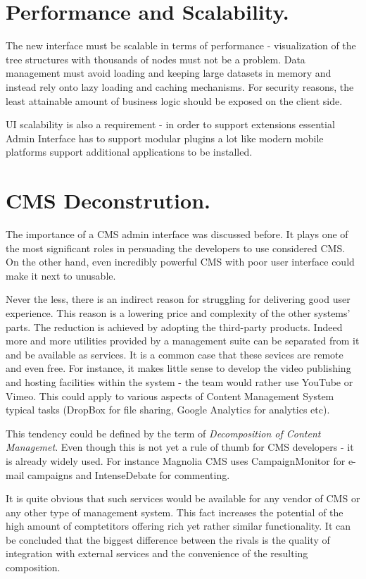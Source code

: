 \section{Performance and Scalability.}
The new interface must be scalable in terms of performance - visualization of
the tree structures with thousands of nodes must not be a problem. Data
management must avoid loading and keeping large datasets in memory and instead
rely onto lazy loading and caching mechanisms. For security reasons, the least
attainable amount of business logic should be exposed on the client side. 

UI scalability is also a requirement - in order to support extensions essential
Admin Interface has to support modular plugins a lot like modern mobile platforms 
support additional applications to be installed.

\section{CMS Deconstrution.}
The importance of a CMS admin interface was discussed before. It plays one of the
most significant roles in persuading the developers to use considered CMS. On the
other hand, even incredibly powerful CMS with poor user interface could make it
next to unusable.

Never the less, there is an indirect reason for struggling for delivering good
user experience. This reason is a lowering price and complexity of the other
systems' parts. The reduction is achieved by adopting the third-party products.
Indeed more and more utilities provided by a management suite can be separated
from it and be available as services. It is a common case that these sevices are
remote and even free. For instance, it makes little sense to develop the video
publishing and hosting facilities within the system - the team would rather use
YouTube or Vimeo. This could apply to various aspects of Content Management
System typical tasks (DropBox for file sharing, Google Analytics for analytics
etc).

This tendency could be defined by the term of \emph{Decomposition of Content
Managemet}. Even though this is not yet a rule of thumb for CMS developers - it
is already widely used. For instance Magnolia CMS uses CampaignMonitor for
e-mail campaigns and IntenseDebate for commenting.

It is quite obvious that such services would be available for any vendor of CMS
or any other type of management system. This fact increases the potential of the
high amount of comptetitors offering rich yet rather similar functionality.
It can be concluded that the biggest difference between the rivals is the
quality of integration with external services and the convenience of the
resulting composition.

